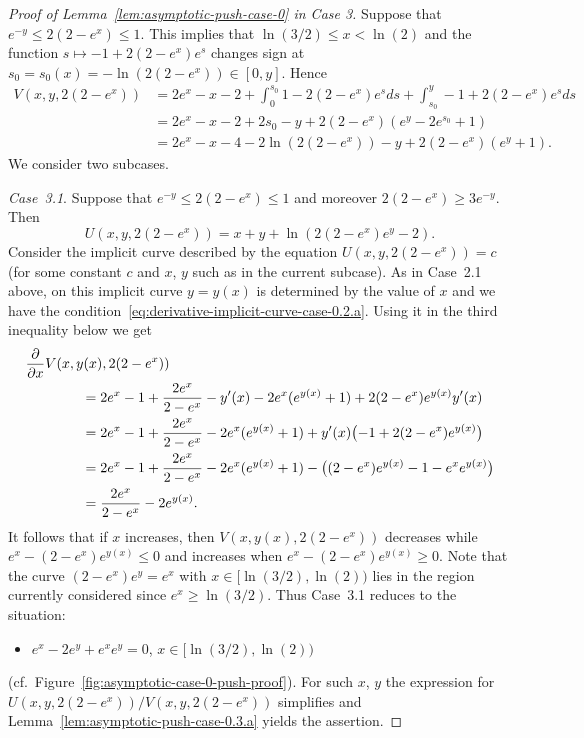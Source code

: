 \documentclass[a4paper]{amsart} %
\theoremstyle{definition}
\theoremstyle{remark}
\numberwithin{equation}{section}
\newcommand*{\XXXasymptoticDenominator}{V}
\newcommand*{\XXXasymptoticNominator}{U}
\begin{document}
	\begin{proof}[Proof of Lemma~\ref{lem:asymptotic-push-case-0} in Case 3]
	Suppose that $e^{-y} \leq 2(2-e^x) \leq 1$.
	This implies that $\ln(3/2) \leq x < \ln(2)$
	 and the function $s \mapsto -1 + 2(2-e^x) e^s$ changes sign at $s_0 = s_0(x)= -\ln(2(2-e^x)) \in [0,y]$. 
	Hence
	\begin{align*}
	\XXXasymptoticDenominator(x,y,2(2-e^x)) &= 2e^x - x -2 + 
	\int_{0}^{ s_0} 1 -  2(2-e^x)  e^{s} ds
	+ \int_{ s_0 }^{y} -1 +  2(2-e^x)  e^{s} ds\\
	& = 2e^x - x- 2  + 2s_0  - y  + 2(2-e^x)(e^y - 2e^{s_0} + 1)\\
 	& = 2e^x - x-  4  - 2\ln(2(2-e^x)) - y   + 2(2-e^x)(e^y + 1).
	\end{align*}
	 We consider two subcases. 
	
	\emph{Case~3.1}. Suppose that $e^{-y} \leq 2(2-e^x) \leq 1 $ and moreover $2(2-e^x) \geq 3e^{-y}$.
	Then
	\begin{equation*}
	\XXXasymptoticNominator(x,y,2(2-e^x)) = x + y + \ln(2(2-e^x) e^y  -2).
	\end{equation*}
	Consider the implicit curve described by the equation  $\XXXasymptoticNominator(x,y,2(2-e^x)) = c$
	(for some constant $c$ and $x$, $y$ such as in the current subcase).
	As in Case~2.1 above,
	on this implicit curve
	$y = y(x)$ is determined by the value of $x$ and we have the condition~\eqref{eq:derivative-implicit-curve-case-0.2.a}.
	Using it in the third inequality below we get 
	\begin{align*}
	\MoveEqLeft[4]
	\frac{\partial}{\partial x} \XXXasymptoticDenominator(x, y(x), 2(2-e^{x})) \\
	&= 2e^{x} - 1  + \frac{2e^x}{2-e^x}
	-y'(x)
	- 2e^{x} (e^{y(x)} + 1) + 2(2-e^{x}) e^{y(x)} y'(x) \\
	&=2e^{x} - 1  + \frac{2e^x}{2-e^x} - 2e^{x} (e^{y(x)} + 1) 
	+ y'(x)\bigl( - 1  + 2(2-e^{x}) e^{y(x)} \bigr) \\
	&=2e^{x} - 1 + \frac{2e^x}{2-e^x}- 2e^{x} (e^{y(x)} + 1) 
	- \bigl((2-e^{x})e^{y(x)} - 1 -e^{x} e^{y(x)}\bigr) \\
	&=\frac{2e^x}{2-e^x} - 2e^{y(x)}.
	\end{align*}
	It follows that if $x$ increases,
	then $\XXXasymptoticDenominator(x,y(x),2(2-e^x))$ decreases 
	while $e^x -(2-e^x)e^{y(x)} \leq 0$
	and increases when $e^x - (2-e^x) e^{y(x)}\geq 0$.
	Note that the curve $(2-e^x)e^y =e^x$ with $x\in[\ln(3/2), \ln(2))$
	lies in the region currently considered since $e^x \geq \ln(3/2)$.
	Thus Case~3.1 reduces to the situation:
	\begin{itemize}
		\item $e^x - 2e^{y} + e^x e^{y} = 0$, $x\in [\ln(3/2), \ln(2))$
		\end{itemize}
	(cf.\ Figure~\ref{fig:asymptotic-case-0-push-proof}).
    For such $x$, $y$ the expression for $\XXXasymptoticNominator(x,y, 2(2-e^x))/\XXXasymptoticDenominator(x,y, 2(2-e^x))$ simplifies 
    and Lemma~\ref{lem:asymptotic-push-case-0.3.a} yields the assertion. 
		

\end{proof}
\end{document}
